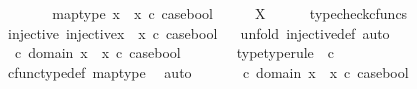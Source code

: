 \begin{isabellebody}
\ \ \ \ \isamarkupfalse%
\ \isamarkupfalse%
\ map{\isacharunderscore}{\kern0pt}type{\isacharcolon}{\kern0pt}\ {\isachardoublequoteopen}{\isacharparenleft}{\kern0pt}x{}\ {\isasymamalg}\ x{}{\isacharparenright}{\kern0pt}\ {\isasymcirc}\isactrlsub c\ case{\isacharunderscore}{\kern0pt}bool\ \ \ {\isacharcolon}{\kern0pt}\ {\isasymOmega}\ {\isasymrightarrow}\ X{\isachardoublequoteclose}\isanewline
\ \ \ \ \isamarkupfalse%
\ typecheck{\isacharunderscore}{\kern0pt}cfuncs\isanewline
\ \ \isamarkupfalse%
\ injective{\isacharcolon}{\kern0pt}\ {\isachardoublequoteopen}injective{\isacharparenleft}{\kern0pt}{\isacharparenleft}{\kern0pt}x{}\ {\isasymamalg}\ x{}{\isacharparenright}{\kern0pt}\ {\isasymcirc}\isactrlsub c\ case{\isacharunderscore}{\kern0pt}bool{\isacharparenright}{\kern0pt}{\isachardoublequoteclose}\isanewline
\ \ \isamarkupfalse%
{\isacharparenleft}{\kern0pt}unfold\ injective{\isacharunderscore}{\kern0pt}def{\isacharcomma}{\kern0pt}\ auto{\isacharparenright}{\kern0pt}\isanewline
\ \ \ \ \isamarkupfalse%
\ {\isasymomega}{}\ {\isasymomega}{}\ \isanewline
\ \ \ \ \isamarkupfalse%
\ {\isachardoublequoteopen}{\isasymomega}{}\ {\isasymin}\isactrlsub c\ domain\ {\isacharparenleft}{\kern0pt}x{}\ {\isasymamalg}\ x{}\ {\isasymcirc}\isactrlsub c\ case{\isacharunderscore}{\kern0pt}bool{\isacharparenright}{\kern0pt}{\isachardoublequoteclose}\isanewline
\ \ \ \ \isamarkupfalse%
\ \isamarkupfalse%
\ {\isasymomega}{}{\isacharunderscore}{\kern0pt}type{\isacharbrackleft}{\kern0pt}type{\isacharunderscore}{\kern0pt}rule{\isacharbrackright}{\kern0pt}{\isacharcolon}{\kern0pt}\ {\isachardoublequoteopen}{\isasymomega}{}\ {\isasymin}\isactrlsub c\ {\isasymOmega}{\isachardoublequoteclose}\isanewline
\ \ \ \ \ \ \isamarkupfalse%
\ cfunc{\isacharunderscore}{\kern0pt}type{\isacharunderscore}{\kern0pt}def\ map{\isacharunderscore}{\kern0pt}type\ \isamarkupfalse%
\ auto\isanewline
\ \ \ \ \isamarkupfalse%
\ {\isachardoublequoteopen}{\isasymomega}{}\ {\isasymin}\isactrlsub c\ domain\ {\isacharparenleft}{\kern0pt}x{}\ {\isasymamalg}\ x{}\ {\isasymcirc}\isactrlsub c\ case{\isacharunderscore}{\kern0pt}bool{\isacharparenright}{\kern0pt}{\isachardoublequoteclose}\isanewline
\ \ \ \ \isamarkupfalse%
\ \isamarkupfalse%

\end{isabellebody}

